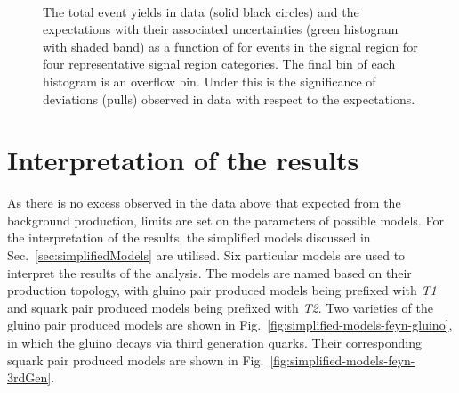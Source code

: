 \begin{figure}[!tbhp]
\begin{center}
{    }~~
  \end{center}
  \caption{The total event yields in data (solid black circles) and
  the \SM expectations with their associated uncertainties (green
  histogram with shaded band) as a function of \MHT for events in the
  signal region for four representative signal region categories. The
  final bin of each histogram is an overflow bin. Under this is the
  significance of deviations (pulls) observed in data with respect to
  the \SM expectations. \label{fig:mht-templates} 
  }
\end{figure}

\clearpage

\section{Interpretation of the results}
\label{sec:signalModel}

As there is no excess observed in the data above that expected from
the \SM background production, limits are set on the parameters of
possible \SUSY models. For the interpretation of the results, the
simplified models discussed in Sec.~\ref{sec:simplifiedModels} are
utilised. Six particular models are used to interpret the results of
the analysis. The models are named based on their production topology,
with gluino pair produced models being prefixed with \emph{T1} and
squark pair produced models being prefixed with \emph{T2}. Two
varieties of the gluino pair produced models are shown in
Fig.~\ref{fig:simplified-models-feyn-gluino}, in which the gluino
decays via third generation quarks. Their corresponding squark pair
produced models are shown in
Fig.~\ref{fig:simplified-models-feyn-3rdGen}.  

